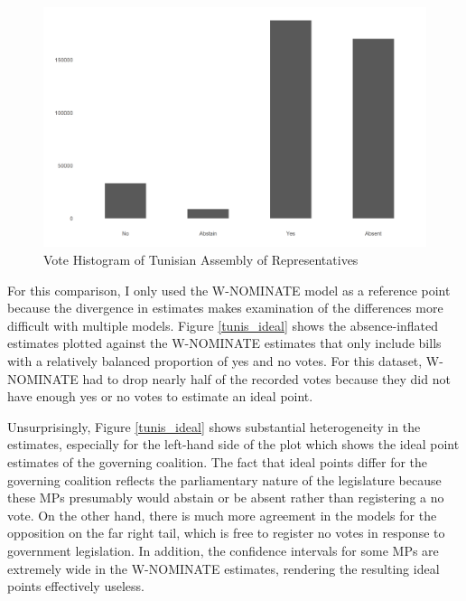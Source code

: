 	\begin{figure}
		\centering
		\caption{Vote Histogram of Tunisian Assembly of Representatives}\label{tunis_arp_hist}
		\includegraphics[width=.8\linewidth]{arp_hist}
	\end{figure}

	For this comparison, I only used the W-NOMINATE model as a reference point because the divergence in estimates makes examination of the differences more difficult with multiple models. Figure \ref{tunis_ideal} shows the absence-inflated estimates plotted against the W-NOMINATE estimates that only include bills with a relatively balanced proportion of yes and no votes. For this dataset, W-NOMINATE had to drop nearly half of the recorded votes because they did not have enough yes or no votes to estimate an ideal point.
	
	Unsurprisingly, Figure \ref{tunis_ideal} shows substantial heterogeneity in the estimates, especially for the left-hand side of the plot which shows the ideal point estimates of the governing coalition. The fact that ideal points differ for the governing coalition reflects the parliamentary nature of the legislature because these MPs presumably would abstain or be absent rather than registering a no vote. On the other hand, there is much more agreement in the models for the opposition on the far right tail, which is free to register no votes in response to government legislation. In addition, the confidence intervals for some MPs are extremely wide in the W-NOMINATE estimates, rendering the resulting ideal points effectively useless. 
	
